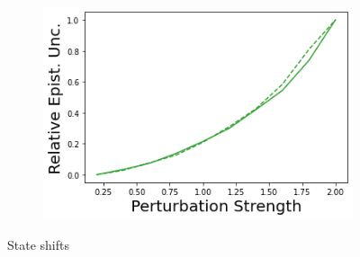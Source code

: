 \begin{figure}
\begin{subfigure}{.24\textwidth}
    \end{subfigure}
    \begin{subfigure}{.24\textwidth}
        \includegraphics[width=\textwidth]{sections/011_icml2022/resources/state_shift-PostNet-AcrobotShift-v0-mean_epistemic_uncertainty_.png}
    \end{subfigure}
        \vspace{-3mm}
    \caption*{State shifts}
    \vspace{2mm}


\end{figure}
